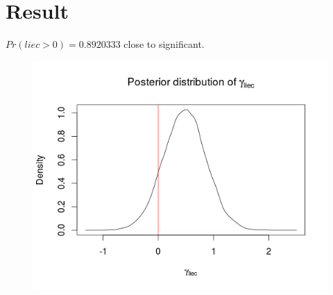 \section{Result}

$Pr(liec > 0) = 0.8920333$ close to significant.

\begin{figure}[ht]
    \centering
    \includegraphics[width=.75\textwidth]{../fig/liec_posterior}
    \label{fig:liec_posterior}
\end{figure}
